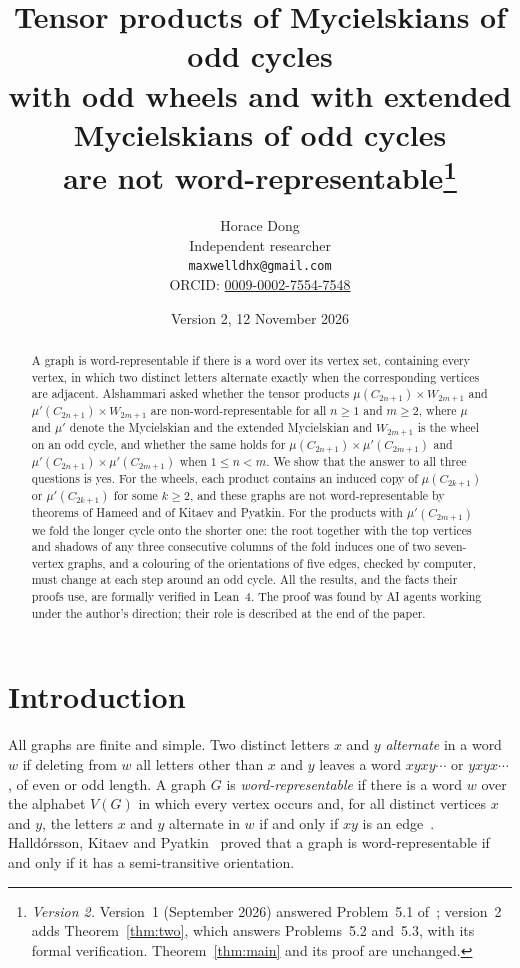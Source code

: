 \documentclass[11pt]{article}
\title{Tensor products of Mycielskians of odd cycles\\ with odd wheels and with
extended Mycielskians of odd cycles\\ are not word-representable\thanks{\emph{Version 2.} Version~1
(September 2026) answered Problem~5.1 of~\cite{alsh}; version~2 adds
Theorem~\ref{thm:two}, which answers Problems~5.2 and~5.3, with its formal
verification. Theorem~\ref{thm:main} and its proof are unchanged.}}
\author{Horace Dong\\ \small Independent researcher\\
\small\texttt{maxwelldhx@gmail.com}\\
\small ORCID: \href{https://orcid.org/0009-0002-7554-7548}{0009-0002-7554-7548}}
\date{Version 2, 12 November 2026}
\theoremstyle{remark}
\begin{document}
\maketitle

\begin{abstract}
A graph is word-representable if there is a word over its vertex set,
containing every vertex, in which two distinct letters alternate exactly when
the corresponding vertices are adjacent. Alshammari asked whether the tensor products
$\mu(C_{2n+1})\times W_{2m+1}$ and $\mu'(C_{2n+1})\times W_{2m+1}$ are
non-word-representable for all $n\ge1$ and $m\ge2$, where $\mu$ and $\mu'$
denote the Mycielskian and the extended Mycielskian and $W_{2m+1}$ is the
wheel on an odd cycle, and whether the same holds for
$\mu(C_{2n+1})\times\mu'(C_{2m+1})$ and $\mu'(C_{2n+1})\times\mu'(C_{2m+1})$
when $1\le n<m$. We show that the answer to all three questions is yes. For
the wheels, each product contains an induced copy of $\mu(C_{2k+1})$ or
$\mu'(C_{2k+1})$ for some $k\ge2$, and these graphs are not word-representable
by theorems of Hameed and of Kitaev and Pyatkin. For the products with
$\mu'(C_{2m+1})$ we fold the longer cycle onto the shorter one: the root together
with the top vertices and shadows of any three consecutive columns of the fold
induces one of two seven-vertex graphs, and a colouring of the orientations of five edges, checked
by computer, must change at each step around an odd cycle. All the results,
and the facts their proofs use, are formally verified in Lean~4. The proof was found by AI agents
working under the author's direction; their role is described at the end of
the paper.
\end{abstract}

\section{Introduction}
All graphs are finite and simple. Two distinct letters $x$ and $y$
\emph{alternate} in a word $w$ if deleting from $w$ all letters other than
$x$ and $y$ leaves a word $xyxy\cdots$ or $yxyx\cdots$, of even or odd
length. A graph $G$ is \emph{word-representable} if there is a word $w$ over
the alphabet $V(G)$ in which every vertex occurs and, for all distinct
vertices $x$ and $y$, the letters $x$ and $y$ alternate in $w$ if and only if
$xy$ is an edge~\cite{kl,alsh}. Halld\'orsson, Kitaev and Pyatkin~\cite{hkp}
proved that a graph is word-representable if and only if it has a
semi-transitive orientation.
\end{document}
